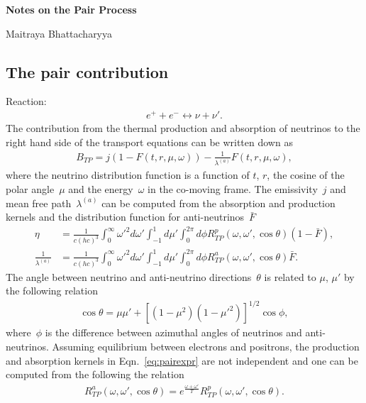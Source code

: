 \documentclass{h2020proposal}
\begin{document}

\centerline{{\textbf{Notes on the Pair Process}}}
\vskip0.5cm
\centerline{Maitraya Bhattacharyya}
\vskip0.5cm

\subsection{The pair contribution}
Reaction:
\begin{align}
	 \boxed{e^{+} + e^{-} \leftrightarrow \nu + \nu'}.
\end{align}
The contribution from the thermal production and absorption of neutrinos to the right hand side of the transport equations can be written down as
\begin{align}
	B_{TP} = j (1 - F(t,r,\mu,\omega)) - \frac{1}{\lambda^{(a)}} F(t,r,\mu,\omega),
\end{align}
where the neutrino distribution function is a function of $t$, $r$, the cosine of the polar angle~$\mu$ and the energy~$\omega$ in the co-moving frame. The emissivity~$j$ and mean free path~$\lambda^{(a)}$ can be computed from the absorption and production kernels and the distribution function for anti-neutrinos~$\bar{F}$~\cite{PonMirIba1998}
\begin{align} \label{eq:pairexpr}
	\eta &= \frac{1}{c(hc)^3} \int_{0}^{\infty} \omega'^2 d\omega' \int_{-1}^{1} d\mu' \int_{0}^{2 \pi} d\phi R^p_{TP}(\omega, \omega', \cos \theta)(1 - \bar{F}), \nonumber \\
	\frac{1}{\lambda^{(a)}} &= \frac{1}{c(hc)^3} \int_{0}^{\infty} \omega'^2 d\omega' \int_{-1}^{1} d\mu' \int_{0}^{2 \pi} d\phi R^a_{TP}(\omega, \omega', \cos \theta)\bar{F}.
\end{align}
The angle between neutrino and anti-neutrino directions~$\theta$ is related to $\mu$, $\mu'$ by the following relation
\begin{align}
	\cos \theta = \mu \mu' + \left[ (1-\mu^2)(1-\mu'^2) \right]^{1/2} \cos \phi,
\end{align}
where~$\phi$ is the difference between azimuthal angles of neutrinos and anti-neutrinos.  Assuming equilibrium between electrons and positrons, the production and absorption kernels in Eqn.~\eqref{eq:pairexpr} are not independent and one can be computed from the following the relation
\begin{align}
	R^a_{TP}(\omega, \omega', \cos \theta) = e^{\frac{\omega+\omega'}{T}} R^p_{TP}(\omega, \omega', \cos \theta).
\end{align}
\end{document}
